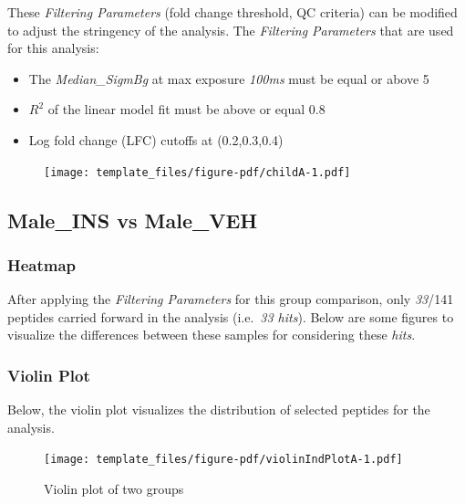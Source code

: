 \documentclass[
  letterpaper,
  DIV=11,
  numbers=noendperiod]{scrreport}
\providecommand{\tightlist}{%
  \setlength{\itemsep}{0pt}\setlength{\parskip}{0pt}}\usepackage{longtable,booktabs,array}
\begin{document}
These \emph{Filtering Parameters} (fold change threshold, QC criteria)
can be modified to adjust the stringency of the analysis. The
\emph{Filtering Parameters} that are used for this analysis:

\begin{itemize}
\tightlist
\item
  The \emph{Median\_SigmBg} at max exposure \emph{100ms} must be equal
  or above 5\\
\item
  \(R^2\) of the linear model fit must be above or equal 0.8\\
\item
  Log fold change (LFC) cutoffs at (0.2,0.3,0.4)
\end{itemize}

\begin{figure}[htbp]

{\centering \texttt{[image: template\_files/figure-pdf/childA-1.pdf]}

}

\end{figure}

\hypertarget{male_ins-vs-male_veh}{%
\subsection{Male\_INS vs Male\_VEH}\label{male_ins-vs-male_veh}}

\hypertarget{heatmap}{%
\subsubsection{Heatmap}\label{heatmap}}

After applying the \emph{Filtering Parameters} for this group
comparison, only \emph{33}/141 peptides carried forward in the analysis
(i.e.~\emph{33 hits}). Below are some figures to visualize the
differences between these samples for considering these \emph{hits}.

\hypertarget{violin-plot}{%
\subsubsection{Violin Plot}\label{violin-plot}}

Below, the violin plot visualizes the distribution of selected peptides
for the analysis.

\begin{figure}[htbp]

{\centering \texttt{[image: template\_files/figure-pdf/violinIndPlotA-1.pdf]}

}

\caption{Violin plot of two groups}

\end{figure}
\end{document}

